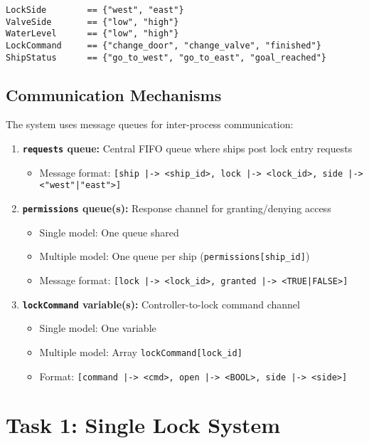 \documentclass[12pt,a4paper]{article}
\begin{document}
\begin{lstlisting}[style=tlaplus]
LockSide        == {"west", "east"}
ValveSide       == {"low", "high"}
WaterLevel      == {"low", "high"}
LockCommand     == {"change_door", "change_valve", "finished"}
ShipStatus      == {"go_to_west", "go_to_east", "goal_reached"}
\end{lstlisting}

\subsection{Communication Mechanisms}

The system uses message queues for inter-process communication:

\begin{enumerate}
    \item \textbf{\texttt{requests} queue:} Central FIFO queue where ships post lock entry requests
    \begin{itemize}
        \item Message format: \texttt{[ship |-> <ship\_id>, lock |-> <lock\_id>, side |-> <"west"|"east">]}
    \end{itemize}
    
    \item \textbf{\texttt{permissions} queue(s):} Response channel for granting/denying access
    \begin{itemize}
        \item Single model: One queue shared
        \item Multiple model: One queue per ship (\texttt{permissions[ship\_id]})
        \item Message format: \texttt{[lock |-> <lock\_id>, granted |-> <TRUE|FALSE>]}
    \end{itemize}
    
    \item \textbf{\texttt{lockCommand} variable(s):} Controller-to-lock command channel
    \begin{itemize}
        \item Single model: One variable
        \item Multiple model: Array \texttt{lockCommand[lock\_id]}
        \item Format: \texttt{[command |-> <cmd>, open |-> <BOOL>, side |-> <side>]}
    \end{itemize}
\end{enumerate}

\newpage
\section{Task 1: Single Lock System}
\end{document}
